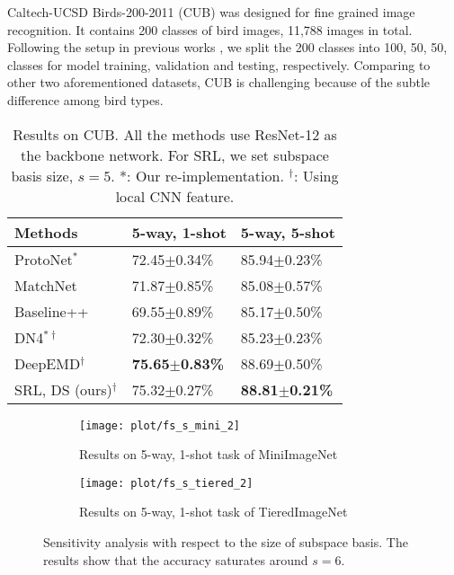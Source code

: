 Caltech-UCSD Birds-200-2011 (CUB) was designed for fine grained image recognition.
It contains 200 classes of bird images, 11,788 images in total.
Following the setup in previous works \cite{ye2020few,zhang2020deepemd}, we split the 200 classes into 100, 50, 50, classes for model training, validation and testing, respectively.
Comparing to other two aforementioned datasets, CUB is challenging because of the subtle difference among bird types. 

\begin{table}[t]
\centering
\begin{tabular}{l|ll}
\hline
Methods                      & 5-way, 1-shot               & 5-way, 5-shot               \\ \hline
ProtoNet$^*$      & 72.45$\pm$0.34\%          & 85.94$\pm$0.23\%          \\
MatchNet                      & 71.87$\pm$0.85\%          & 85.08$\pm$0.57\%          \\
Baseline++                      & 69.55$\pm$0.89\%          & 85.17$\pm$0.50\%          \\
DN4$^{* \dagger}$            & 72.30$\pm$0.32\%          & 85.23$\pm$0.23\%          \\
DeepEMD$^{\dagger}$                           & \textbf{75.65$\pm$0.83\%} & 88.69$\pm$0.50\%          \\
SRL, DS (ours)$^{\dagger}$                        & 75.32$\pm$0.27\%         & \textbf{88.81$\pm$0.21\%} \\ \hline
\end{tabular}
\caption{Results on CUB. All the methods use ResNet-12 as the backbone network. For SRL, we set subspace basis size, $s=5$. *: Our re-implementation. $^\dagger$: Using local CNN feature.}
\label{tab:sota_cub}
\end{table}


\begin{figure}[t]
\centering
  \begin{subfigure}[b]{0.4\textwidth}
         \centering
         \texttt{[image: plot/fs\_s\_mini\_2]}
         \caption{Results on 5-way, 1-shot task of MiniImageNet}
         \label{fig:kshot_proto}
     \end{subfigure}
     \begin{subfigure}[b]{0.4\textwidth}
         \centering
         \texttt{[image: plot/fs\_s\_tiered\_2]}
         \caption{Results on 5-way, 1-shot task of TieredImageNet}
         \label{fig:kshot_dist}
     \end{subfigure}
     \caption{Sensitivity analysis with respect to the size of subspace basis. The results show that the accuracy saturates around $s=6$.}
     \label{fig:basis_size}
\end{figure}


